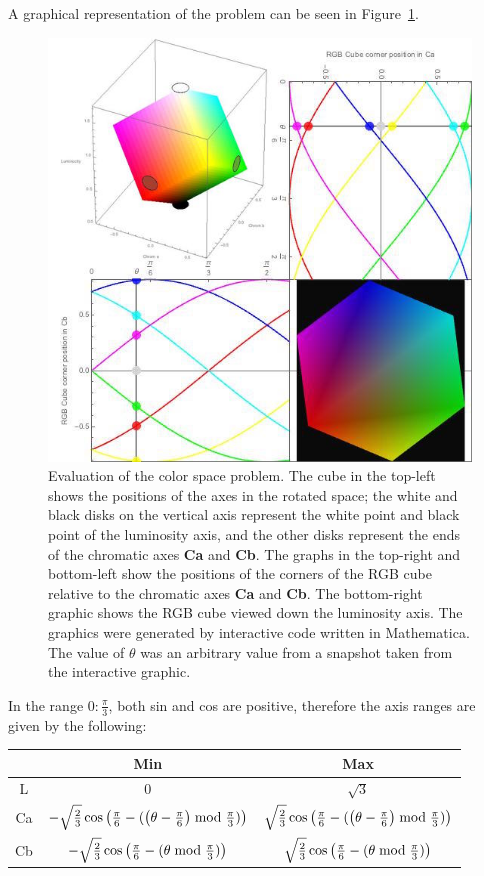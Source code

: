 A graphical representation of the problem can be seen in Figure~\ref{fig:YABCubeEval}.

\begin{figure}[h!]
  \centering
    \includegraphics[width=\textwidth]{Chapter2/Figs/CornersOf_theRGBCube.jpg}
    \caption{Evaluation of the color space problem. The cube in the top-left shows the positions of the axes in the rotated space; the white and black disks on the vertical axis represent the white point and black point of the luminosity axis, and the other disks represent the ends of the chromatic axes \textbf{Ca} and \textbf{Cb}. The graphs in the top-right and bottom-left show the positions of the corners of the RGB cube relative to the chromatic axes \textbf{Ca} and \textbf{Cb}. The bottom-right graphic shows the RGB cube viewed down the luminosity axis. The graphics were generated by interactive code written in Mathematica. The value of $\theta$ was an arbitrary value from a snapshot taken from the interactive graphic.}\label{fig:YABCubeEval}
\end{figure}

In the range $0:\frac{\pi}{3}$, both sin and cos are positive, therefore the axis ranges are given by the following:

\begin{tabular}{|c|c|c|}
  \hline
    & Min & Max \\ \hline
  L & \(0\) & \(\sqrt{3}\) \\
  Ca & \(- \sqrt{\frac{2}{3}} \cos \left(\frac{\pi}{6}-(\left(\theta -\frac{\pi}{6}\right) \bmod \frac{\pi }{3})\right) \)&\( \sqrt{\frac{2}{3}} \cos \left(\frac{\pi}{6}-(\left(\theta -\frac{\pi}{6}\right) \bmod \frac{\pi }{3})\right) \)\\
 Cb & \(-\sqrt{\frac{2}{3}} \cos \left(\frac{\pi}{6}-(\theta  \bmod \frac{\pi }{3})\right) \)&\( \sqrt{\frac{2}{3}} \cos \left(\frac{\pi}{6}-(\theta  \bmod \frac{\pi }{3})\right) \)\\
  \hline
\end{tabular}

